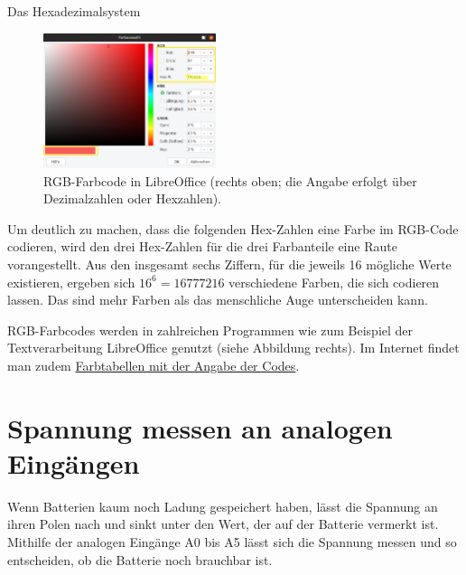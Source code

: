 \begin{zsfg}{Das Hexadezimalsystem}
	\begin{figure}
		\centering
		\includegraphics[width=0.45\textwidth]{./pics/Farbauswahl-LibreOffice.png}
		\caption{RGB-Farbcode in LibreOffice (rechts oben; die Angabe erfolgt über Dezimalzahlen oder Hexzahlen).}
	\end{figure}
	Um deutlich zu machen, dass die folgenden Hex-Zahlen eine Farbe im RGB-Code codieren, wird den drei Hex-Zahlen für die drei Farbanteile eine Raute vorangestellt. Aus den insgesamt sechs Ziffern, für die jeweils 16 mögliche Werte existieren, ergeben sich $16^6=16777216$ verschiedene Farben, die sich codieren lassen. Das sind mehr Farben als das menschliche Auge unterscheiden kann.
	
	RGB-Farbcodes werden in zahlreichen Programmen wie zum Beispiel der Textverarbeitung LibreOffice genutzt (siehe Abbildung rechts). Im Internet findet man zudem \href{http://www.farb-tabelle.de/de/farbtabelle.htm}{Farbtabellen mit der Angabe der Codes}.
\end{zsfg}
\restoregeometry
\onehalfspacing

\section{Spannung messen an analogen Eingängen}

Wenn Batterien kaum noch Ladung gespeichert haben, lässt die Spannung an ihren Polen nach und sinkt unter den Wert, der auf der Batterie vermerkt ist. Mithilfe der analogen Eingänge A0 bis A5 lässt sich die Spannung messen und so entscheiden, ob die Batterie noch brauchbar ist.


